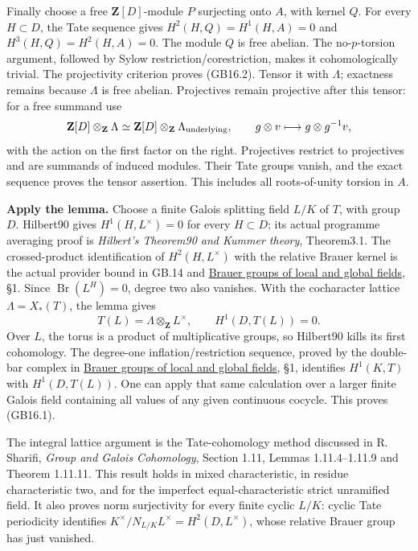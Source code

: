 \documentclass[
  11pt,
]{article}
\begin{document}
Finally choose a free \(\mathbf Z[D]\)-module \(P\) surjecting onto
\(A\), with kernel \(Q\). For every \(H\subset D\), the Tate sequence
gives \(H^2(H,Q)=H^1(H,A)=0\) and \(H^3(H,Q)=H^2(H,A)=0\). The module
\(Q\) is free abelian. The no-\(p\)-torsion argument, followed by Sylow
restriction/corestriction, makes it cohomologically trivial. The
projectivity criterion proves (GB16.2). Tensor it with \(\Lambda\);
exactness remains because \(\Lambda\) is free abelian. Projectives
remain projective after this tensor: for a free summand use \[
 \mathbf Z[D]\otimes_{\mathbf Z}\Lambda
 \simeq\mathbf Z[D]\otimes_{\mathbf Z}\Lambda_{\rm underlying},
 \qquad g\otimes v\longmapsto g\otimes g^{-1}v ,
\] with the action on the first factor on the right. Projectives
restrict to projectives and are summands of induced modules. Their Tate
groups vanish, and the exact sequence proves the tensor assertion. This
includes all roots-of-unity torsion in \(A\).

\textbf{Apply the lemma.} Choose a finite Galois splitting field \(L/K\)
of \(T\), with group \(D\). Hilbert90 gives \(H^1(H,L^\times)=0\) for
every \(H\subset D\); its actual programme averaging proof is
\emph{Hilbert's Theorem90 and Kummer theory}, Theorem3.1. The
crossed-product identification of \(H^2(H,L^\times)\) with the relative
Brauer kernel is the actual provider bound in GB.14 and
\href{../NT-CFT/brauer-groups-of-local-and-global-fields.html}{Brauer
groups of local and global fields}, §1. Since
\(\operatorname{Br}(L^H)=0\), degree two also vanishes. With the
cocharacter lattice \(\Lambda=X_*(T)\), the lemma gives \[
       T(L)=\Lambda\otimes_{\mathbf Z}L^\times,\qquad
                         H^1(D,T(L))=0 .
\] Over \(L\), the torus is a product of multiplicative groups, so
Hilbert90 kills its first cohomology. The degree-one
inflation/restriction sequence, proved by the double-bar complex in
\href{../NT-CFT/brauer-groups-of-local-and-global-fields.html}{Brauer
groups of local and global fields}, §1, identifies \(H^1(K,T)\) with
\(H^1(D,T(L))\). One can apply that same calculation over a larger
finite Galois field containing all values of any given continuous
cocycle. This proves (GB16.1).

The integral lattice argument is the Tate-cohomology method discussed in
R. Sharifi, \emph{Group and Galois Cohomology}, Section 1.11, Lemmas
1.11.4--1.11.9 and Theorem 1.11.11. This result holds in mixed
characteristic, in residue characteristic two, and for the imperfect
equal-characteristic strict unramified field. It also proves norm
surjectivity for every finite cyclic \(L/K\): cyclic Tate periodicity
identifies \(K^\times/N_{L/K}L^\times=H^2(D,L^\times)\), whose relative
Brauer group has just vanished.
\end{document}
